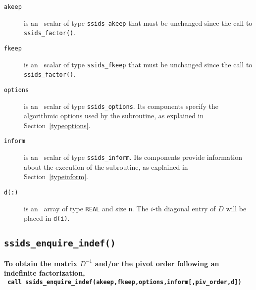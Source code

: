 \begin{description}

\item[\texttt{akeep}]  is an \intentin\ scalar of type {\tt ssids\_akeep} that
must be unchanged since the call to {\tt ssids\_factor()}.

\item[\texttt{fkeep}]  is an \intentin\ scalar of type {\tt ssids\_fkeep} that
must be unchanged since the call to {\tt ssids\_factor()}.

\item[\texttt{options}] is an \intentin\ scalar of type {\tt ssids\_options}.
Its components specify the algorithmic options used by the subroutine, as
explained in Section~\ref{typeoptions}.

\item[\texttt{inform}] is an \intentout\ scalar of type
{\tt ssids\_inform}. Its components provide information about the execution
of the subroutine, as explained in Section~\ref{typeinform}.

\item[\texttt{d(:)}] is an  \intentout\ array of type {\tt  REAL} and
size {\tt n}. The $i$-th diagonal entry of $D$ will be placed in {\tt d(i)}.

\end{description}

\subsection{\texttt{ssids\_enquire\_indef()}}
\textbf{To obtain the matrix $D^{-1}$ and/or the pivot order following an
   indefinite factorization,
   \vspace*{0.1cm} \\
   \texttt{ \hspace*{0.2cm}
     call ssids\_enquire\_indef(akeep,fkeep,options,inform[,piv\_order,d])
   }
}

